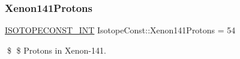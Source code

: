 \subsubsection{\texorpdfstring{Xenon141\+Protons}{Xenon141Protons}}
{\footnotesize\ttfamily \mbox{\hyperlink{group___isotope_const-_macros_ga5f18360b3e99483a35c32d789e62621c}{I\+S\+O\+T\+O\+P\+E\+C\+O\+N\+S\+T\+\_\+\+I\+NT}} Isotope\+Const\+::\+Xenon141\+Protons = 54}

\$ \$ Protons in Xenon-\/141. 